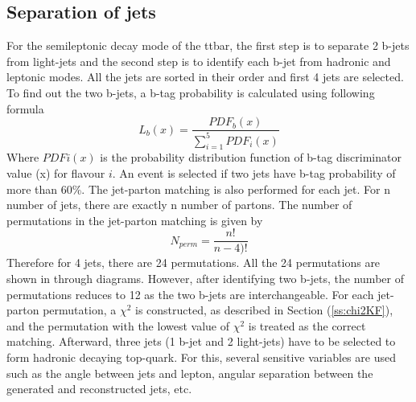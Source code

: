 \subsection{Separation of jets}
\label{ss:jetSepKF} 
For the semileptonic decay mode of the ttbar, the first step is to separate 2 
b-jets from light-jets and the second step is to identify each b-jet from hadronic 
and leptonic modes.  All the jets are sorted in their \pt order and first 4 jets are
selected. To find out the two b-jets, a b-tag probability is calculated using 
following formula \cite{DHondt:2006iej}
\begin{equation}
	L_{b}(x) = \frac{PDF_b(x)}{\sum_{i=1}^5 PDF_i(x)}
\end{equation}
Where $PDFi(x)$ is the probability distribution function of b-tag discriminator value
(x) for flavour $i$. An event is selected if two jets have b-tag probability of more 
than 60\%. The jet-parton matching is also performed for each jet. For n number of 
jets, there are exactly n number of partons. The number of permutations in the 
jet-parton matching is given by
\begin{equation}
	N_{perm} = \frac{n!}{n-4)!}
\end{equation}
Therefore for 4 jets, there are 24 permutations. All the 24 permutations are shown 
in \cite{KinFitThesis} through diagrams. However, after identifying two b-jets, the number of 
permutations reduces to 12 as the two b-jets are interchangeable. For each 
jet-parton permutation, a $\chi^2$ is constructed, as described in Section 
(\ref{ss:chi2KF}), and the permutation with the lowest value of $\chi^2$ is
treated as the correct matching. Afterward, three jets (1 b-jet and 2 light-jets) 
have to be selected to form hadronic decaying top-quark. For this, several sensitive 
variables are used \cite{DHondt:2006iej} such as the angle between jets and lepton, 
angular separation between the generated and reconstructed jets, etc.


